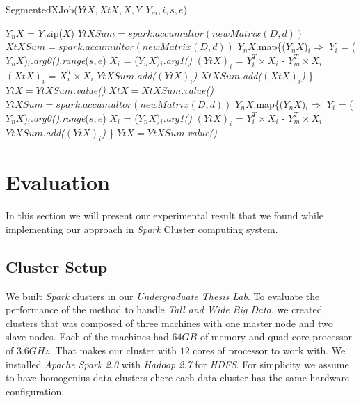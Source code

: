 \documentclass[10pt,conference,letterpaper]{IEEEtran}
\begin{document}
\begin{algorithm} [!htbp]
\label{segmented2}
  \caption{SegmentedXJob($YtX,XtX,X,Y,Y_m,i,s,e$)}
  \begin{algorithmic} [1]
	\State $Y_nX$ = $Y$.zip($X$)
	   
	 		\State $YtXSum = spark.accumultor(newMatrix(D,d))$
			\State $XtXSum = spark.accumultor(newMatrix(D,d))$
	 		\State $Y_nX$.map\{($Y_nX$)$_i \Rightarrow$
	 		\State \tab $Y_i$ = ($Y_nX$)$_i$.\textit{arg0()}.\textit{range}($s,e$)
			\State \tab $X_i$ = ($Y_nX$)$_i$.\textit{arg1()}
			\State \tab $(YtX)_i$ = $Y_i^T \times  X_i$ - $Y_m^T \times X_i$   
			\State \tab $(XtX)_i$ = $X_i^T \times  X_i$
			 \State \tab $YtXSum$.\textit{add($(YtX)_i$)}
			 \State \tab $XtXSum$.\textit{add($(XtX)_i$)}
			\State \}
		\State $YtX = YtXSum$.\textit{value()}
		\State $XtX = XtXSum$.\textit{value()}
	\Else
			\State $YtXSum = spark.accumultor(newMatrix(D,d))$
	 		\State $Y_nX$.map\{($Y_nX$)$_i \Rightarrow$
			\State \tab $Y_i$ = ($Y_nX$)$_i$.\textit{arg0()}.\textit{range}($s,e$)
			\State \tab $X_i$ = ($Y_nX$)$_i$.\textit{arg1()}
			\State \tab $(YtX)_i$ = $Y_i^T \times  X_i$ - $Y_m^T \times X_i$   
			 \State \tab $YtXSum$.\textit{add($(YtX)_i$)}
			\State \}
		\State $YtX = YtXSum$.\textit{value()}
	 \EndIf
  \end{algorithmic}
\end{algorithm}




\section{Evaluation}
In this section we will present our experimental result that we found while implementing our approach in \textit{Spark} Cluster computing system.
\subsection{Cluster Setup}
We built \textit{Spark} clusters in our \textit{Undergraduate Thesis Lab}. To evaluate the performance of the method to handle \textit{Tall and Wide Big Data}, we created clusters that was composed of three machines with one master node and two slave nodes. Each of the machines had $64GB$ of memory and quad core processor of $3.6GHz$. That makes our cluster with $12$ cores of processor to work with. We installed \textit{Apache Spark 2.0} with \textit{Hadoop 2.7} for \textit{HDFS}. For simplicity we assume to have homogenius data clusters ehere each data cluster has the same hardware configuration. 
\end{document}
